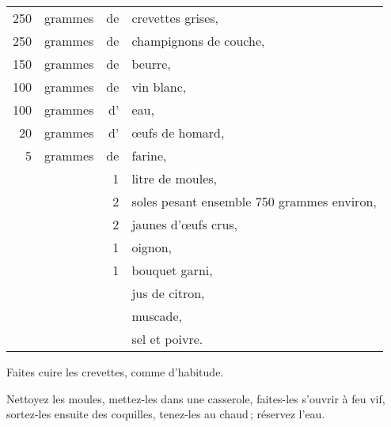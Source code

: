 \footnotesize
\begin{longtable}{rrrp{16em}}
    250 & grammes & de & crevettes grises,                                                                \\
    250 & grammes & de & champignons de couche,                                                           \\
    150 & grammes & de & beurre,                                                                          \\
    100 & grammes & de & vin blanc,                                                                       \\
    100 & grammes & d' & eau,                                                                             \\
     20 & grammes & d' & œufs de homard,                                                                  \\
      5 & grammes & de & farine,                                                                          \\
        &         &  1 & litre de moules,                                                                 \\
        &         &  2 & soles pesant ensemble 750 grammes environ,                                       \\
        &         &  2 & jaunes d'œufs crus,                                                              \\
        &         &  1 & oignon,                                                                          \\
        &         &  1 & bouquet garni,                                                                   \\
        &         &    & jus de citron,                                                                   \\
        &         &    & muscade,                                                                         \\
        &         &    & sel et poivre.                                                                   \\
\end{longtable}
\normalsize

Faites cuire les crevettes, comme d'habitude.

Nettoyez les moules, mettez-les dans une casserole, faites-les s'ouvrir à feu
vif, sortez-les ensuite des coquilles, tenez-les au chaud ; réservez l'eau.

